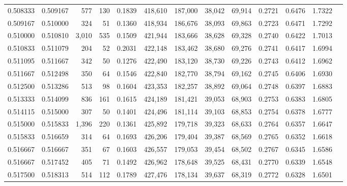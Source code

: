 \begin{tabular}{rrrrrrrrrrrrr}
0.508333 & 0.509167 &   577 & 130 &                                     0.1839 & 418,610 & 187,000 &  38,042 &  69,914 & 0.2721 & 0.6476 & 1.7322 \\
0.509167 & 0.510000 &   324 &  51 &                                     0.1360 & 418,934 & 186,676 &  38,093 &  69,863 & 0.2723 & 0.6471 & 1.7292 \\
0.510000 & 0.510810 & 3,010 & 535 &                                     0.1509 & 421,944 & 183,666 &  38,628 &  69,328 & 0.2740 & 0.6422 & 1.7013 \\
0.510833 & 0.511079 &   204 &  52 &                                     0.2031 & 422,148 & 183,462 &  38,680 &  69,276 & 0.2741 & 0.6417 & 1.6994 \\
0.511095 & 0.511667 &   342 &  50 &                                     0.1276 & 422,490 & 183,120 &  38,730 &  69,226 & 0.2743 & 0.6412 & 1.6962 \\
0.511667 & 0.512498 &   350 &  64 &                                     0.1546 & 422,840 & 182,770 &  38,794 &  69,162 & 0.2745 & 0.6406 & 1.6930 \\
0.512500 & 0.513286 &   513 &  98 &                                     0.1604 & 423,353 & 182,257 &  38,892 &  69,064 & 0.2748 & 0.6397 & 1.6883 \\
0.513333 & 0.514099 &   836 & 161 &                                     0.1615 & 424,189 & 181,421 &  39,053 &  68,903 & 0.2753 & 0.6383 & 1.6805 \\
0.514115 & 0.515000 &   307 &  50 &                                     0.1401 & 424,496 & 181,114 &  39,103 &  68,853 & 0.2754 & 0.6378 & 1.6777 \\
0.515000 & 0.515833 & 1,396 & 220 &                                     0.1361 & 425,892 & 179,718 &  39,323 &  68,633 & 0.2764 & 0.6357 & 1.6647 \\
0.515833 & 0.516659 &   314 &  64 &                                     0.1693 & 426,206 & 179,404 &  39,387 &  68,569 & 0.2765 & 0.6352 & 1.6618 \\
0.516667 & 0.516667 &   351 &  67 &                                     0.1603 & 426,557 & 179,053 &  39,454 &  68,502 & 0.2767 & 0.6345 & 1.6586 \\
0.516667 & 0.517452 &   405 &  71 &                                     0.1492 & 426,962 & 178,648 &  39,525 &  68,431 & 0.2770 & 0.6339 & 1.6548 \\
0.517500 & 0.518313 &   514 & 112 &                                     0.1789 & 427,476 & 178,134 &  39,637 &  68,319 & 0.2772 & 0.6328 & 1.6501 \\

\end{tabular}
